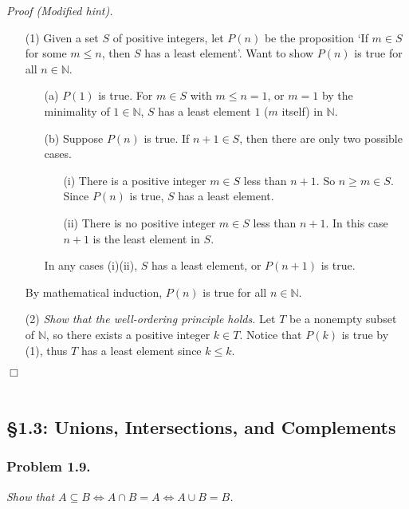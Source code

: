 \documentclass{article}
\begin{document}
\emph{Proof (Modified hint).}
\begin{enumerate}
\item[(1)]
Given a set $S$ of positive integers,
let $P(n)$ be the proposition
`If $m \in S$ for some $m \leq n$, then $S$ has a least element'.
Want to show $P(n)$ is true for all $n \in \mathbb{N}$.
\begin{enumerate}
\item[(a)]
$P(1)$ is true.
For $m \in S$ with $m \leq n = 1$,
or $m = 1$ by the minimality of $1 \in \mathbb{N}$,
$S$ has a least element $1$ ($m$ itself) in $\mathbb{N}$.
\item[(b)]
Suppose $P(n)$ is true.
If $n+1 \in S$, then there are only two possible cases.
  \begin{enumerate}
  \item[(i)]
  There is a positive integer $m \in S$ less than $n+1$.
  So $n \geq m \in S$.
  Since $P(n)$ is true, $S$ has a least element.
  \item[(ii)]
  There is no positive integer $m \in S$ less than $n+1$.
  In this case $n+1$ is the least element in $S$.
  \end{enumerate}
  In any cases (i)(ii), $S$ has a least element, or $P(n+1)$ is true.
\end{enumerate}
By mathematical induction, $P(n)$ is true for all $n \in \mathbb{N}$.
\item[(2)]
\emph{Show that the well-ordering principle holds.}
Let $T$ be a nonempty subset of $\mathbb{N}$,
so there exists a positive integer $k \in T$.
Notice that $P(k)$ is true by (1),
thus $T$ has a least element since $k \leq k$.
\end{enumerate}
$\Box$ \\\\






\subsection*{\S 1.3: Unions, Intersections, and Complements \\}



\subsubsection*{Problem 1.9.}
\emph{Show that
$A \subseteq B
\Leftrightarrow A \cap B = A
\Leftrightarrow A \cup B = B$.} \\
\end{document}
